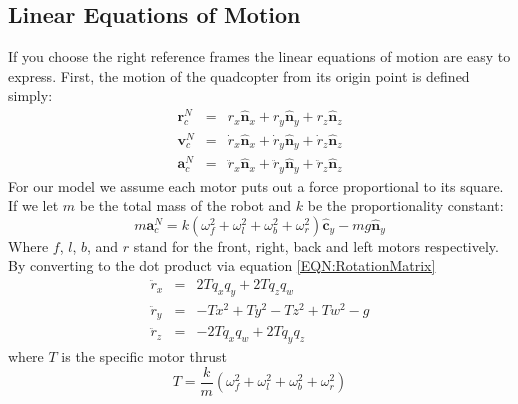 \documentclass[lettersize,journal]{IEEEtran}
\begin{document}
\subsection{Linear Equations of Motion}
If you choose the right reference frames the linear equations of motion are easy to express. First, the motion of the quadcopter from its origin point is defined simply:
\begin{eqnarray}
  \mathbf{r}^N_c &=& r_x \mathbf{\hat{n}}_x + r_y \mathbf{\hat{n}}_y + r_z \mathbf{\hat{n}}_z \\
  \mathbf{v}^N_c &=& \dot{r}_x \mathbf{\hat{n}}_x + \dot{r}_y \mathbf{\hat{n}}_y + \dot{r}_z \mathbf{\hat{n}}_z \\
  \mathbf{a}^N_c &=& \ddot{r}_x \mathbf{\hat{n}}_x + \ddot{r}_y \mathbf{\hat{n}}_y + \ddot{r}_z \mathbf{\hat{n}}_z
\end{eqnarray}
For our model we assume each motor puts out a force proportional to its square.
If we let $m$ be the total mass of the robot and $k$ be the proportionality constant:
\begin{equation}
  m\mathbf{a}^N_c = k \left(\omega_f^2 + \omega_l^2 + \omega_b^2 + \omega_r^2\right) \mathbf{\hat{c}}_y - mg \mathbf{\hat{n}}_y
\end{equation}
Where $f$, $l$, $b$, and $r$ stand for the front, right, back and left motors respectively. 
By converting to the dot product via equation \ref{EQN:RotationMatrix}
\begin{eqnarray}
  \ddot{r}_x &=& 2Tq_xq_y+2Tq_zq_w \\
  \ddot{r}_y &=& -Tx^2+Ty^2-Tz^2+Tw^2 - g\\
  \ddot{r}_z &=& -2Tq_xq_w+2Tq_yq_z 
\end{eqnarray}
where $T$ is the specific motor thrust
\begin{equation}
	T = \frac{k}{m}\left(\omega_f^2 + \omega_l^2 + \omega_b^2 + \omega_r^2\right)
\end{equation}
\end{document}

